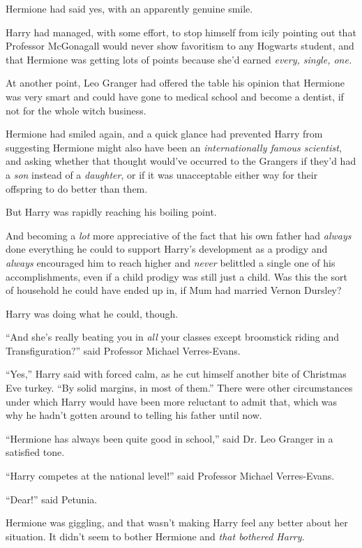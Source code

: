 Hermione had said yes, with an apparently genuine smile.

Harry had managed, with some effort, to stop himself from icily pointing
out that Professor McGonagall would never show favoritism to any
Hogwarts student, and that Hermione was getting lots of points because
she'd earned \emph{every, single, one.}

At another point, Leo Granger had offered the table his opinion that
Hermione was very smart and could have gone to medical school and become
a dentist, if not for the whole witch business.

Hermione had smiled again, and a quick glance had prevented Harry from
suggesting Hermione might also have been an \emph{internationally famous
scientist}, and asking whether that thought would've occurred to the
Grangers if they'd had a \emph{son} instead of a \emph{daughter}, or if
it was unacceptable either way for their offspring to do better than
them.

But Harry was rapidly reaching his boiling point.

And becoming a \emph{lot} more appreciative of the fact that his own
father had \emph{always} done everything he could to support Harry's
development as a prodigy and \emph{always} encouraged him to reach
higher and \emph{never} belittled a single one of his accomplishments,
even if a child prodigy was still just a child. Was this the sort of
household he could have ended up in, if Mum had married Vernon Dursley?

Harry was doing what he could, though.

``And she's really beating you in \emph{all} your classes except
broomstick riding and Transfiguration?'' said Professor Michael
Verres-Evans.

``Yes,'' Harry said with forced calm, as he cut himself another bite of
Christmas Eve turkey. ``By solid margins, in most of them.'' There were
other circumstances under which Harry would have been more reluctant to
admit that, which was why he hadn't gotten around to telling his father
until now.

``Hermione has always been quite good in school,'' said Dr. Leo Granger
in a satisfied tone.

``Harry competes at the national level!'' said Professor Michael
Verres-Evans.

``Dear!'' said Petunia.

Hermione was giggling, and that wasn't making Harry feel any better
about her situation. It didn't seem to bother Hermione and \emph{that
bothered Harry.}


